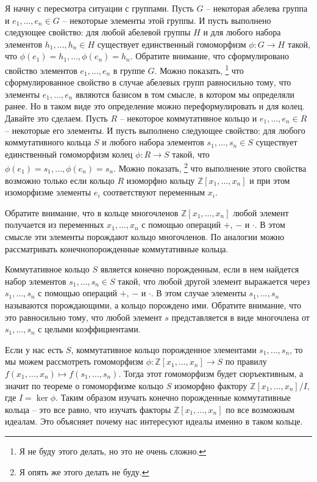 Я начну с пересмотра ситуации с группами.
Пусть $G$ -- некоторая абелева группа и $e_1,\ldots, e_n\in G$ -- некоторые элементы этой группы.
И пусть выполнено следующее свойство: для любой абелевой группы $H$ и для любого набора элементов $h_1,\ldots, h_n\in H$ существует единственный гомоморфизм $\phi\colon G\to H$ такой, что $\phi(e_1) = h_1,\ldots,\phi(e_n) = h_n$.
Обратите внимание, что сформулировано свойство элементов $e_1,\ldots,e_n$ в группе $G$.
Можно показать,%
\footnote{Я не буду этого делать, но это не очень сложно.}
что сформулированное свойство в случае абелевых групп равносильно тому, что элементы $e_1,\ldots,e_n$ являются базисом в том смысле, в котором мы определяли ранее.
Но в таком виде это определение можно переформулировать и для колец.
Давайте это сделаем.
Пусть $R$ -- некоторое коммутативное кольцо и $e_1,\ldots,e_n\in R$ -- некоторые его элементы.
И пусть выполнено следующее свойство: для любого коммутативного кольца $S$ и любого набора элементов $s_1,\ldots,s_n\in S$ существует единственный гомоморфизм колец $\phi\colon R\to S$ такой, что $\phi(e_1) = s_1,\ldots,\phi(e_n) = s_n$.
Можно показать,%
\footnote{Я опять же этого делать не буду.}
что выполнение этого свойства возможно только если кольцо $R$ изоморфно кольцу $\mathbb Z[x_1,\ldots,x_n]$ и при этом изоморфизме элементы $e_i$ соответствуют переменным $x_i$.

Обратите внимание, что в кольце многочленов $\mathbb Z[x_1,\ldots,x_n]$ любой элемент получается из переменных $x_1,\ldots, x_n$ с помощью операций $+$, $-$ и $\cdot$.
В этом смысле эти элементы порождают кольцо многочленов.
По аналогии можно рассматривать конечнопорожденные коммутативные кольца.

\begin{definition}
Коммутативное кольцо $S$ является конечно порожденным, если в нем найдется набор элементов $s_1,\ldots, s_n\in S$ такой, что любой другой элемент выражается через $s_1,\ldots,s_n$ с помощью операций $+$, $-$ и $\cdot$.
В этом случае элементы $s_1,\ldots, s_n$ называются порождающими, а кольцо порождено ими.
Обратите внимание, что это равносильно тому, что любой элемент $s$ представляется в виде многочлена от $s_1,\ldots,s_n$ с целыми коэффициентами.
\end{definition}

Если у нас есть $S$, коммутативное кольцо порожденное элементами $s_1,\ldots, s_n$, то мы можем рассмотреть гомоморфизм $\phi\colon \mathbb Z[x_1,\ldots,x_n]\to S$ по правилу $f(x_1,\ldots,x_n) \mapsto f(s_1,\ldots,s_n)$.
Тогда этот гомоморфизм будет сюръективным, а значит по теореме о гомоморфизме кольцо $S$ изоморфно фактору $\mathbb Z[x_1,\ldots, x_n] / I$, где $I = \ker \phi$.
Таким образом изучать конечно порожденные коммутативные кольца -- это все равно, что изучать факторы $\mathbb Z[x_1,\ldots, x_n]$ по все возможным идеалам.
Это объясняет почему нас интересуют идеалы именно в таком кольце.

